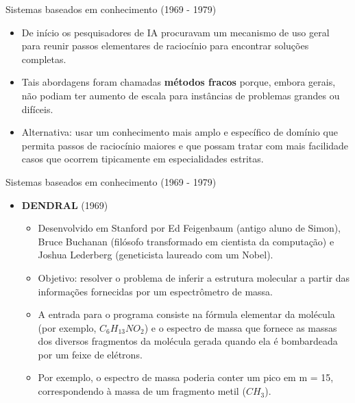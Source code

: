 \documentclass{libs/ufc_format}
\begin{document}
\begin{frame}{Sistemas baseados em conhecimento (1969 - 1979)}
    \begin{itemize}
        \justifying
        \item<1> De início os pesquisadores de IA procuravam um mecanismo de uso geral para reunir passos elementares de raciocínio para encontrar soluções completas.
        \item<1> Tais abordagens foram chamadas \textbf{métodos fracos} porque, embora gerais, não podiam ter aumento de escala para instâncias de problemas grandes ou difíceis.
        \item<2> Alternativa: usar um conhecimento mais amplo e específico de domínio que permita passos de raciocínio maiores e que possam tratar com mais facilidade casos que ocorrem tipicamente em especialidades estritas.
    \end{itemize}
\end{frame}

\begin{frame}{Sistemas baseados em conhecimento (1969 - 1979)}
    \begin{itemize}
        \justifying
        \item \textbf{DENDRAL} (1969)
            \begin{itemize}
                \justifying
                \item Desenvolvido em Stanford por Ed Feigenbaum (antigo aluno de Simon), Bruce Buchanan (filósofo transformado em cientista da computação) e Joshua Lederberg (geneticista laureado com um Nobel).
                \item<2> Objetivo: resolver o problema de inferir a estrutura molecular a partir das informações fornecidas por um espectrômetro de massa.
                \item<2> A entrada para o programa consiste na fórmula elementar da molécula (por exemplo, $C_{6}H_{13}NO_{2}$) e o espectro de massa que fornece as massas dos diversos fragmentos da molécula gerada quando ela é bombardeada por um feixe de elétrons.
                \item<2> Por exemplo, o espectro de massa poderia conter um pico em m = 15, correspondendo à massa de um fragmento metil ($CH_{3}$).
            \end{itemize}
    \end{itemize}
\end{frame}
\end{document}
